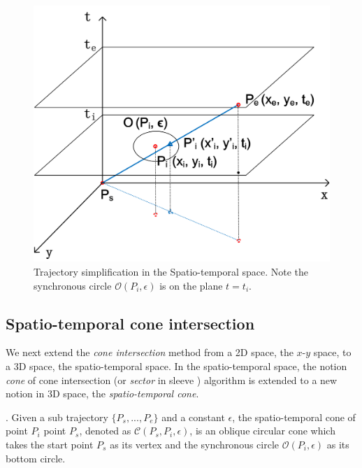 \begin{figure}[tb!]
\centering
\includegraphics[scale=0.6]{figures/Fig-SEDin3D.png}
\vspace{-1ex}
\caption{\small Trajectory simplification in the Spatio-temporal space. Note the synchronous circle $\mathcal{O}(P_i, \epsilon)$ is on the plane $t=t_i$.}
\vspace{-3ex}
\label{fig:sed3d}
\end{figure}




\subsection{Spatio-temporal cone intersection}

We next extend the \emph{cone intersection} method \cite{Williams:Longest, Sklansky:Cone, Zhao:Sleeve} from a 2D space, \ie the $x$-$y$ space, to a 3D space, \ie the spatio-temporal space.
In the spatio-temporal space, the notion \emph{cone} of cone intersection \cite{Williams:Longest, Sklansky:Cone} (or \emph{sector} in sleeve \cite{Zhao:Sleeve}) algorithm is extended to a new notion in 3D space, \ie the \emph{spatio-temporal cone}.

. Given a sub trajectory $\{P_s,...,P_e\}$ and a constant $\epsilon$, the spatio-temporal cone of point $P_i$ \wrt point $P_s$, denoted as $\mathcal{C}(P_s, P_i, \epsilon)$, is an oblique circular cone which takes the start point $P_s$ as its vertex and the synchronous circle $\mathcal{O}(P_i, \epsilon)$ as its bottom circle.

